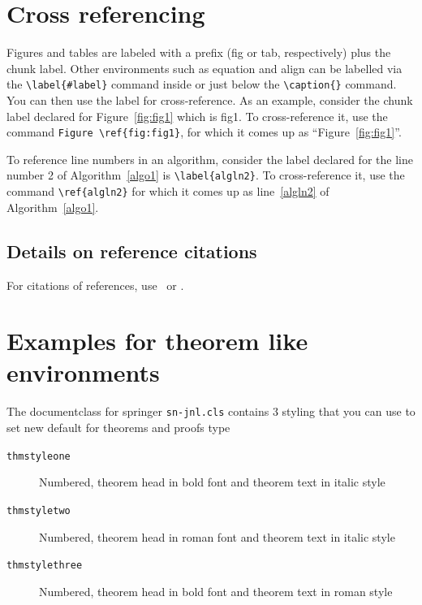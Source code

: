 \documentclass[sn-vancouver,Numbered,pdflatex]{sn-jnl}
\theoremstyle{remark}
\theoremstyle{definition}
\begin{document}
\hypertarget{sec8}{%
\section{Cross referencing}\label{sec8}}

Figures and tables are labeled with a prefix (fig or tab, respectively)
plus the chunk label. Other environments such as equation and align can
be labelled via the \texttt{\textbackslash{}label\{\#label\}} command
inside or just below the \texttt{\textbackslash{}caption\{\}} command.
You can then use the label for cross-reference. As an example, consider
the chunk label declared for Figure~\ref{fig:fig1} which is fig1. To
cross-reference it, use the command
\texttt{Figure\ \textbackslash{}ref\{fig:fig1\}}, for which it comes up
as ``Figure~\ref{fig:fig1}''.

To reference line numbers in an algorithm, consider the label declared
for the line number 2 of Algorithm~\ref{algo1} is
\texttt{\textbackslash{}label\{algln2\}}. To cross-reference it, use the
command \texttt{\textbackslash{}ref\{algln2\}} for which it comes up as
line~\ref{algln2} of Algorithm~\ref{algo1}.

\hypertarget{subsec7}{%
\subsection{Details on reference citations}\label{subsec7}}

For citations of references, use~\citet{bib1} or \citep{bib2}.

\hypertarget{sec10}{%
\section{Examples for theorem like environments}\label{sec10}}

The documentclass for springer \texttt{sn-jnl.cls} contains 3 styling
that you can use to set new default for theorems and proofs type

\begin{description}
\item[\texttt{thmstyleone}]
Numbered, theorem head in bold font and theorem text in italic style
\item[\texttt{thmstyletwo}]
Numbered, theorem head in roman font and theorem text in italic style
\item[\texttt{thmstylethree}]
Numbered, theorem head in bold font and theorem text in roman style
\end{description}
\end{document}
